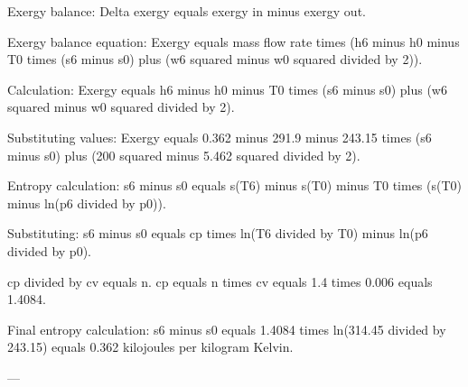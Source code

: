 Exergy balance:  
Delta exergy equals exergy in minus exergy out.  

Exergy balance equation:  
Exergy equals mass flow rate times (h6 minus h0 minus T0 times (s6 minus s0) plus (w6 squared minus w0 squared divided by 2)).  

Calculation:  
Exergy equals h6 minus h0 minus T0 times (s6 minus s0) plus (w6 squared minus w0 squared divided by 2).  

Substituting values:  
Exergy equals 0.362 minus 291.9 minus 243.15 times (s6 minus s0) plus (200 squared minus 5.462 squared divided by 2).  

Entropy calculation:  
s6 minus s0 equals s(T6) minus s(T0) minus T0 times (s(T0) minus ln(p6 divided by p0)).  

Substituting:  
s6 minus s0 equals cp times ln(T6 divided by T0) minus ln(p6 divided by p0).  

cp divided by cv equals n.  
cp equals n times cv equals 1.4 times 0.006 equals 1.4084.  

Final entropy calculation:  
s6 minus s0 equals 1.4084 times ln(314.45 divided by 243.15) equals 0.362 kilojoules per kilogram Kelvin.  

---